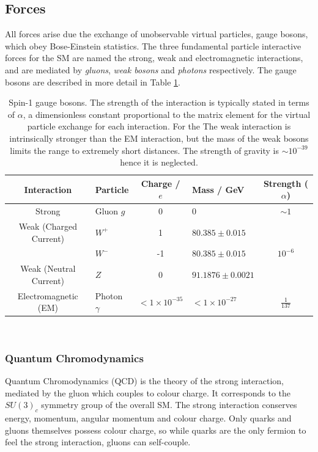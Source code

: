 	\subsection{Forces}

		All forces arise due the exchange of unobservable virtual particles, gauge bosons, which obey Bose-Einstein statistics. The three fundamental particle interactive forces for the SM are named the strong, weak and electromagnetic interactions, and are mediated by \textit{gluons}, \textit{weak bosons} and \textit{photons} respectively. The gauge bosons are described in more detail in Table \ref{t:tab:boson}.

		\begin{table}[ht]
			\caption{Spin-1 gauge bosons. The strength of the interaction is typically stated in terms of $\alpha$, a dimensionless constant proportional to the matrix element for the virtual particle exchange for each interaction. For the  The weak interaction is intrinsically stronger than the EM interaction, but the mass of the weak bosons limits the range to extremely short distances.  The strength of gravity is $\sim10^{-39}$ hence it is neglected. \cite{pdg}}
			\label{t:tab:boson}
			\medskip
			\centering
			\begin{tabular}{clclc}\toprule
				Interaction & Particle & Charge / $e$ & Mass / GeV & Strength ($\alpha$) \\\midrule
				Strong    &     Gluon $g$      & 0 & 0 & $\sim1$\\
				Weak (Charged Current)&     $W^+$    &    1   & $80.385\pm0.015$ & \\
				&     $W^-$    &    -1   & $80.385\pm0.015$ & $10^{-6}$ \\
				Weak (Neutral Current)&     $Z$   &    0   & $91.1876\pm0.0021$ & \\
				Electromagnetic (EM)   &     Photon $\gamma$  &  $<1\times10^{-35}$   & $<1\times10^{-27}$ & $\frac{1}{137}$\\\bottomrule
			\end{tabular}\\[5pt]
		\end{table}

		\newpage
		\subsubsection{Quantum Chromodynamics}

		Quantum Chromodynamics (QCD) is the theory of the strong interaction, mediated by the gluon which couples to colour charge. It corresponds to the $SU(3)_c$ symmetry group of the overall SM. The strong interaction conserves energy, momentum, angular momentum and colour charge. Only quarks and gluons themselves possess colour charge, so while quarks are the only fermion to feel the strong interaction, gluons can self-couple.

